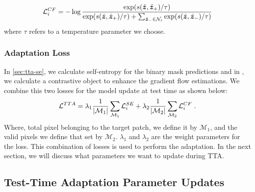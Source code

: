 \begin{equation}
    \small
    \mathcal{L}_i^{CF} = - \log \frac{\exp( s (\hat{\bm{ z}}, \hat{\bm{ z}}_+)/\tau )}{ \exp( s (\hat{\bm{ z}}, \hat{\bm{ z}}_+)/\tau ) + \sum_{\hat{\bm{ z}}_- \in \mathcal{N}_i} \exp( s (\hat{\bm{ z}}, \hat{\bm{ z}}_-)/\tau ) }\\
    \label{eq-contrastive-flow-loss}
  \end{equation}
where $\tau$ refers to a temperature parameter we choose. 

\subsubsection{Adaptation Loss}
In \cref{sec:tta-se}, we calculate self-entropy for the binary mask predictions and in , we calculate a contrastive object to enhance the gradient flow estimations. We combine this two losses for the model update at test time as shown below:
\begin{equation}
    \small
    \mathcal{L}^{TTA} = \lambda_1\frac{1}{| \mathcal{M}_1 |} \sum_{\mathcal{M}_{1}} \mathcal{L}^{SE}_i + \lambda_2\frac{1}{| \mathcal{M}_2 |} \sum_{\mathcal{M}_2} \mathcal{L}^{CF}_i \; .
    \label{eq-tta-loss}
  \end{equation}
Where, total pixel belonging to the target patch, we define it by $\mathcal{M}_1$, and the valid pixels we define that set by $\mathcal{M}_2$. $\lambda_1$ and $\lambda_2$ are the weight parameters for the loss. This combination of losses is used to perform the adaptation. In the next section, we will discuss what parameters we want to update during TTA. 

\subsection{Test-Time Adaptation Parameter Updates}
